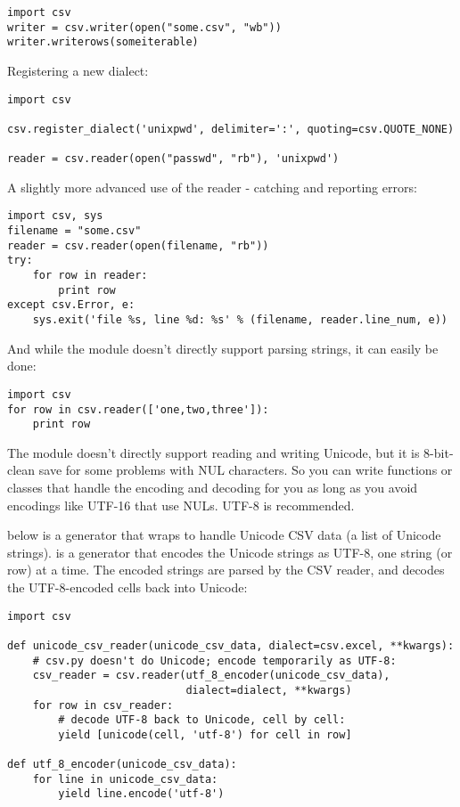 \begin{verbatim}
import csv
writer = csv.writer(open("some.csv", "wb"))
writer.writerows(someiterable)
\end{verbatim}

Registering a new dialect:

\begin{verbatim}
import csv

csv.register_dialect('unixpwd', delimiter=':', quoting=csv.QUOTE_NONE)

reader = csv.reader(open("passwd", "rb"), 'unixpwd')
\end{verbatim}

A slightly more advanced use of the reader - catching and reporting errors:

\begin{verbatim}
import csv, sys
filename = "some.csv"
reader = csv.reader(open(filename, "rb"))
try:
    for row in reader:
        print row
except csv.Error, e:
    sys.exit('file %s, line %d: %s' % (filename, reader.line_num, e))
\end{verbatim}

And while the module doesn't directly support parsing strings, it can
easily be done:

\begin{verbatim}
import csv
for row in csv.reader(['one,two,three']):
    print row
\end{verbatim}

The  module doesn't directly support reading and writing
Unicode, but it is 8-bit-clean save for some problems with \ASCII{} NUL
characters.  So you can write functions or classes that handle the
encoding and decoding for you as long as you avoid encodings like
UTF-16 that use NULs.  UTF-8 is recommended.

 below is a generator that wraps
 to handle Unicode CSV data (a list of Unicode
strings).   is a generator that encodes the
Unicode strings as UTF-8, one string (or row) at a time.  The encoded
strings are parsed by the CSV reader, and
 decodes the UTF-8-encoded cells back
into Unicode:

\begin{verbatim}
import csv

def unicode_csv_reader(unicode_csv_data, dialect=csv.excel, **kwargs):
    # csv.py doesn't do Unicode; encode temporarily as UTF-8:
    csv_reader = csv.reader(utf_8_encoder(unicode_csv_data),
                            dialect=dialect, **kwargs)
    for row in csv_reader:
        # decode UTF-8 back to Unicode, cell by cell:
        yield [unicode(cell, 'utf-8') for cell in row]

def utf_8_encoder(unicode_csv_data):
    for line in unicode_csv_data:
        yield line.encode('utf-8')
\end{verbatim}

